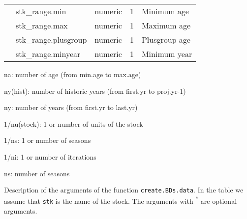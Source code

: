 \begin{landscape}
\begin{table}[!ht]
\begin{footnotesize}
\begin{threeparttable}
\begin{tabular}{lllll}
          & stk\_range.min       &	numeric &	1 &	Minimum age\\
          & stk\_range.max       &	numeric &	1 &	Maximum age\\
          & stk\_range.plusgroup &	numeric &	1 &	Plusgroup age\\
          & stk\_range.minyear   &	numeric &	1 &	Minimum year\\
        \hline
      \end{tabular}
      
      \begin{tablenotes}
        \item na: number of age (from min.age to max.age)
        \item ny(hist): number of historic years (from first.yr to proj.yr-1)
        \item ny: number of years (from first.yr to last.yr)
        \item 1/nu(stock): 1 or number of units of the stock
        \item 1/ns: 1 or number of seasons
        \item 1/ni: 1 or number of iterations
        \item ns: number of seasons
      \end{tablenotes}
      
    \end{threeparttable}
  \end{footnotesize}

\end{table}			



\begin{table}[!ht]

  \centering
  \begin{footnotesize}
    
    \caption{Description of the arguments of the function \texttt{create.BDs.data}. 
      In the table we assume that \texttt{stk} is the name of the stock. 
      The arguments with \textsuperscript{*} are optional arguments.}
    
    \label{tb:A4.table3}
    
    \begin{threeparttable}
    

\end{threeparttable}
\end{footnotesize}
\end{table}
\end{landscape}
